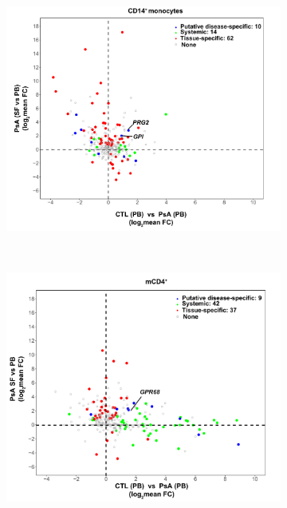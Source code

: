 \begin{figure}[htbp]
\centering
\begin{subfigure}{0.6\textwidth}
\centering
\includegraphics[width=\textwidth]{./Results3/pdfs/PSA_array_correlation_CD14_FC_HVPsA_vs_SFPBPsA}
\caption{\textbf{}}
\end{subfigure} \\
\begin{subfigure}{0.6\textwidth}
\centering
\includegraphics[width=\textwidth]{./Results3/pdfs/PSA_array_correlation_CD4_FC_HVPsA_vs_SFPBPsA}

\end{subfigure}
\end{figure}
